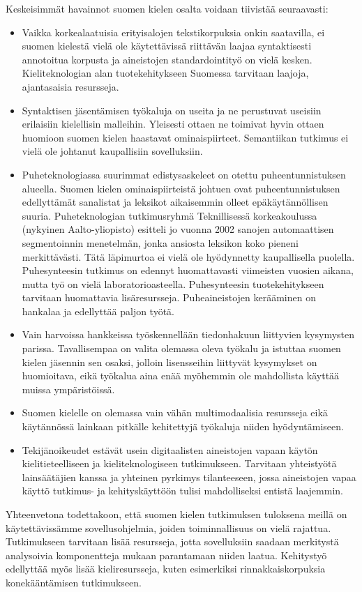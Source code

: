 \begin{multicols}{2}
Keskeisimmät havainnot suomen kielen osalta voidaan tiivistää seuraavasti:
\begin{itemize}
\item Vaikka korkealaatuisia erityisalojen tekstikorpuksia onkin
    saatavilla, ei suomen kielestä vielä ole käytettävissä riittävän
    laajaa syntaktisesti annotoitua korpusta ja aineistojen
    standardointityö on vielä kesken.  Kieliteknologian alan
    tuotekehitykseen Suomessa tarvitaan laajoja, ajantasaisia
    resursseja.

\item Syntaktisen jäsentämisen työkaluja on useita ja ne perustuvat
    useisiin erilaisiin kielellisin malleihin. Yleisesti ottaen ne
    toimivat hyvin ottaen huomioon suomen kielen haastavat
    ominaispiirteet. Semantiikan tutkimus ei vielä ole johtanut
    kaupallisiin sovelluksiin.

\item Puheteknologiassa suurimmat edistysaskeleet on otettu
    puheentunnistuksen alueella. Suomen kielen ominaispiirteistä
    johtuen ovat puheentunnistuksen edellyttämät sanalistat ja
    leksikot aikaisemmin olleet epäkäytännöllisen suuria.
    Puheteknologian tutkimusryhmä Teknillisessä korkeakoulussa
    (nykyinen Aalto-yliopisto) esitteli jo vuonna 2002 sanojen
    automaattisen segmentoinnin menetelmän, jonka ansiosta leksikon
    koko pieneni merkittävästi. Tätä läpimurtoa ei vielä ole
    hyödynnetty kaupallisella puolella. Puhesynteesin tutkimus on
    edennyt huomattavasti viimeisten vuosien aikana, mutta työ on
    vielä laboratorioasteella. Puhesynteesin tuotekehitykseen
    tarvitaan huomattavia lisäresursseja. Puheaineistojen kerääminen
    on hankalaa ja edellyttää paljon työtä.

\item Vain harvoissa hankkeissa työskennellään tiedonhakuun liittyvien
    kysymysten parissa. Tavallisempaa on valita olemassa oleva työkalu
    ja istuttaa suomen kielen jäsennin sen osaksi, jolloin
    lisensseihin liittyvät kysymykset on huomioitava, eikä työkalua
    aina enää myöhemmin ole mahdollista käyttää muissa ympäristöissä.

\item Suomen kielelle on olemassa vain vähän multimodaalisia
    resursseja eikä käytännössä lainkaan pitkälle kehitettyjä
    työkaluja niiden hyödyntämiseen.

\item Tekijänoikeudet estävät usein digitaalisten aineistojen vapaan
    käytön kielitieteelliseen ja kieliteknologiseen
    tutkimukseen. Tarvitaan yhteistyötä lainsäätäjien kanssa ja
    yhteinen pyrkimys tilanteeseen, jossa aineistojen vapaa käyttö
    tutkimus- ja kehityskäyttöön tulisi mahdolliseksi entistä
    laajemmin.
\end{itemize}
Yhteenvetona todettakoon, että suomen kielen tutkimuksen tuloksena
meillä on käytettävissämme sovellusohjelmia, joiden toiminnallisuus on
vielä rajattua.  Tutkimukseen tarvitaan lisää resursseja, jotta
sovelluksiin saadaan merkitystä analysoivia komponentteja mukaan
parantamaan niiden laatua. Kehitystyö edellyttää myös lisää
kieliresursseja, kuten esimerkiksi rinnakkaiskorpuksia konekääntämisen
tutkimukseen.



\end{multicols}
